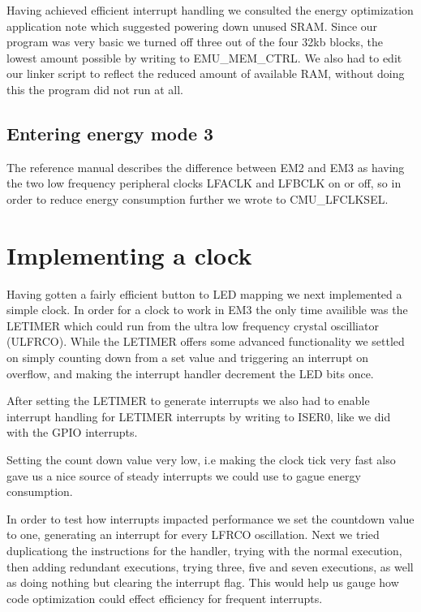 Having achieved efficient interrupt handling we consulted the energy optimization application note which suggested powering down unused SRAM. Since our program was very basic we turned off three out of the four 32kb blocks, the lowest amount possible by writing to EMU\_MEM\_CTRL. We also had to edit our linker script to reflect the reduced amount of available RAM, without doing this the program did not run at all.

\subsection{Entering energy mode 3}

The reference manual describes the difference between EM2 and EM3 as having the two low frequency peripheral clocks LFACLK and LFBCLK on or off, so in order to reduce energy consumption further we wrote to CMU\_LFCLKSEL.

\section{Implementing a clock}

Having gotten a fairly efficient button to LED mapping we next implemented a simple clock. In order for a clock to work in EM3 the only time availible was the LETIMER which could run from the ultra low frequency crystal oscilliator (ULFRCO). While the LETIMER offers some advanced functionality we settled on simply counting down from a set value and triggering an interrupt on overflow, and making the interrupt handler decrement the LED bits once.

After setting the LETIMER to generate interrupts we also had to enable interrupt handling for LETIMER interrupts by writing to ISER0, like we did with the GPIO interrupts. 

Setting the count down value very low, i.e making the clock tick very fast also gave us a nice source of steady interrupts we could use to gague energy consumption.

In order to test how interrupts impacted performance we set the countdown value to one, generating an interrupt for every LFRCO oscillation. Next we tried duplicationg the instructions for the handler, trying with the normal execution, then adding redundant executions, trying three, five and seven executions, as well as doing nothing but clearing the interrupt flag. This would help us gauge how code optimization could effect efficiency for frequent interrupts.